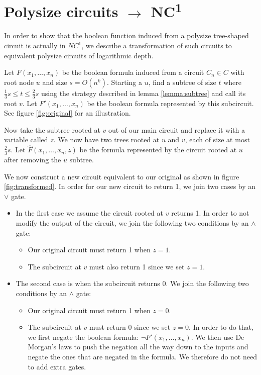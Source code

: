 \documentclass{article}
\begin{document}
\newpage
\section{Polysize circuits $\rightarrow$ NC\textsuperscript{1}}

In order to show that the boolean function induced from a polysize tree-shaped circuit is actually in $NC^1$, we describe a transformation of such circuits to equivalent polysize circuits of logarithmic depth.

Let $F(x_1,\dotsc,x_n)$ be the boolean formula induced from a circuit $C_n \in C$ with root node $u$ and size $s=O(n^k)$. Starting a $u$, find a subtree of size $t$ where $\frac{1}{3}s\leq t \leq \frac{2}{3}s$ using the strategy described in lemma \ref{lemma:subtree} and call its root $v$. Let $F'(x_1,\dotsc,x_n)$ be the boolean formula represented by this subcircuit. See figure \ref{fig:original} for an illustration.

Now take the subtree rooted at $v$ out of our main circuit and replace it with a variable called $z$. We now have two trees rooted at $u$ and $v$, each of size at most $\frac{2}{3}s$. Let $\hat{F}(x_1,\dotsc,x_n,z)$ be the formula represented by the circuit rooted at $u$ after removing the $u$ subtree. 

We now construct a new circuit equivalent to our original as shown in figure \ref{fig:transformed}. In order for our new circuit to return 1, we join two cases by an $\lor$ gate.
\begin{itemize}
\item In the first case we assume the circuit rooted at $v$ returns 1. In order to not modify the output of the circuit, we join the following two conditions by an $\land$ gate:
\begin{itemize}
\item Our original circuit must return 1 when $z=1$.
\item The subcircuit at $v$ must also return 1 since we set $z=1$.
\end{itemize}
\item The second case is when the subcircuit returns 0. We join the following two conditions by an $\land$ gate:
\begin{itemize}
\item Our original circuit must return 1 when $z=0$.
\item The subcircuit at $v$ must return 0 since we set $z=0$. In order to do that, we first negate the boolean formula: $\neg F'(x_1,\dotsc,x_n)$. We then use De Morgan's laws to push the negation all the way down to the inputs and negate the ones that are negated in the formula. We therefore do not need to add extra gates.
\end{itemize}
\end{itemize}
\end{document}
